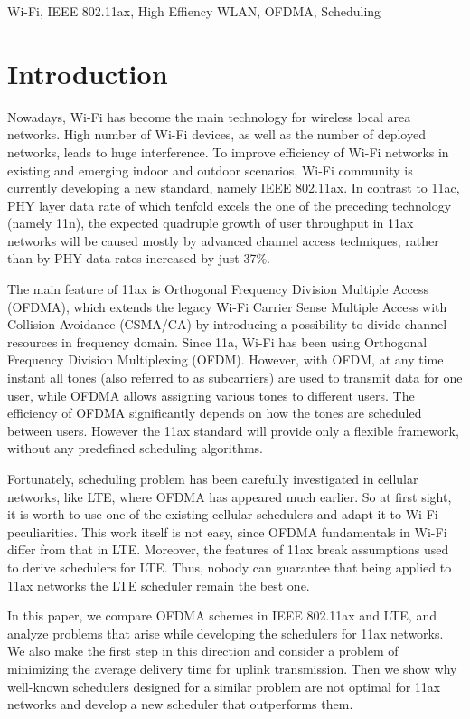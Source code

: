 \begin{IEEEkeywords}
	Wi-Fi, IEEE 802.11ax, High Effiency WLAN, OFDMA, Scheduling
\end{IEEEkeywords}

\section{Introduction}
Nowadays, Wi-Fi has become the main technology for wireless local area networks. High number of Wi-Fi devices, as well as the number of deployed networks, leads to huge interference. To improve efficiency of Wi-Fi networks in existing and emerging indoor and outdoor scenarios, Wi-Fi community is currently developing a new standard, namely IEEE 802.11ax. 
In contrast to 11ac, PHY layer data rate of which tenfold excels the one of the preceding technology (namely 11n), the expected quadruple growth of user throughput in 11ax networks will be caused mostly by advanced channel access techniques, rather than by PHY data rates increased by just 37\%.

The main feature of 11ax is Orthogonal Frequency Division Multiple Access (OFDMA), which extends the legacy Wi-Fi Carrier Sense Multiple Access with Collision Avoidance (CSMA/CA) by introducing a possibility to divide channel resources in frequency domain. Since 11a, Wi-Fi has been using Orthogonal Frequency Division Multiplexing (OFDM). However, with OFDM, at any time instant all tones (also referred to as subcarriers) are used to transmit data for one user, while OFDMA allows assigning various tones to different users. The efficiency of OFDMA significantly depends on how the tones are scheduled between users. However the 11ax standard will provide only a flexible framework, without any predefined scheduling algorithms. 

Fortunately, scheduling problem has been carefully investigated in cellular networks, like LTE, where OFDMA has appeared much earlier. So at first sight, it is worth to use one of the existing cellular schedulers and adapt it to Wi-Fi peculiarities. This work itself is not easy, since OFDMA fundamentals in Wi-Fi differ from that in LTE. Moreover, the features of 11ax break assumptions used to derive schedulers for LTE. Thus, nobody can guarantee that being applied to 11ax networks the LTE scheduler remain the best one. 

In this paper, we compare OFDMA schemes in IEEE 802.11ax and LTE, and analyze problems that arise while developing the schedulers for 11ax networks. We also make the first step in this direction and consider a problem of minimizing the average delivery time for uplink transmission. Then we show why well-known schedulers designed for a similar problem are not optimal for 11ax networks and develop a new scheduler that outperforms them. 

